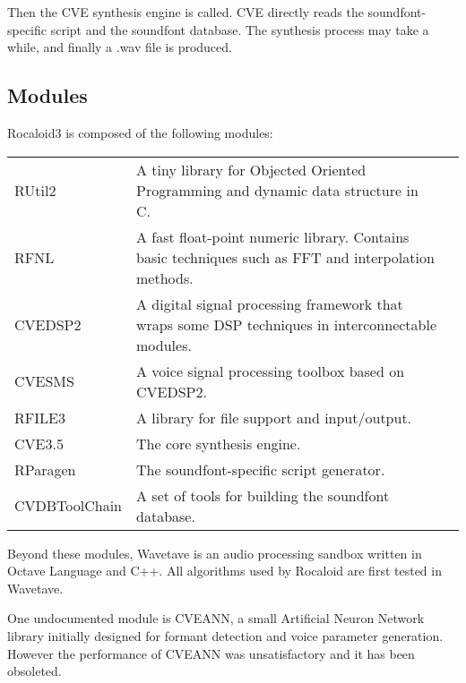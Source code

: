         Then the CVE synthesis engine is called. CVE directly reads the soundfont-specific script and the soundfont database. The synthesis process may take a while, and finally a .wav file is produced.
        
        \newpage

\subsection{Modules}\indent

        Rocaloid3 is composed of the following modules:
        
        \bigskip
        \begin{tabular}{lll}
        	RUtil2 & \parbox{9.5cm}{A tiny library for Objected Oriented Programming and dynamic data structure in C.}\\
        	RFNL & \parbox{9.5cm}{A fast float-point numeric library. Contains basic techniques such as FFT and interpolation methods.}\\
        	CVEDSP2 & \parbox{9.5cm}{A digital signal processing framework that wraps some DSP techniques in interconnectable modules.}\\
        	CVESMS & \parbox{9.5cm}{A voice signal processing toolbox based on CVEDSP2.}\\
        	RFILE3 & \parbox{9.5cm}{A library for file support and input/output.}\\
        	CVE3.5 & \parbox{9.5cm}{The core synthesis engine.}\\
        	RParagen & \parbox{9.5cm}{The soundfont-specific script generator.}\\
        	CVDBToolChain & \parbox{9.5cm}{A set of tools for building the soundfont database.}\\
        \end{tabular}
        \bigskip
        
        Beyond these modules, Wavetave is an audio processing sandbox written in Octave Language and C++. All algorithms used by Rocaloid are first tested in Wavetave.
        
        One undocumented module is CVEANN, a small Artificial Neuron Network library initially designed for formant detection and voice parameter generation. However the performance of CVEANN was unsatisfactory and it has been obsoleted.
        
        \newpage
        
        
